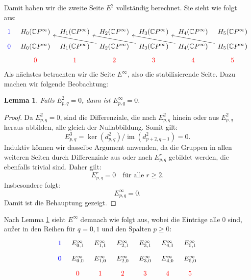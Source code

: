 \documentclass[12pt]{article}
\numberwithin{conj}{section}
\newtheorem{lemma}[conj]{Lemma}
\begin{document}
    Damit haben wir die zweite Seite $E^{2}$ vollständig berechnet. Sie sieht wie folgt
    aus:
    \[
        \begin{tikzcd}
            [sep=tiny] {\color{blue}1} & {H_0(\mathbb{C}P^\infty)} & {H_1(\mathbb{C}P^\infty)}
            & {H_2(\mathbb{C}P^\infty)} & {H_3(\mathbb{C}P^\infty)} & {H_4(\mathbb{C}P^\infty)}
            & {H_5(\mathbb{C}P^\infty)} \\ {\color{blue}0} & {H_0(\mathbb{C}P^\infty)}
            & {H_1(\mathbb{C}P^\infty)} & {H_2(\mathbb{C}P^\infty)} & {H_3(\mathbb{C}P^\infty)}
            & {H_4(\mathbb{C}P^\infty)} & {H_5(\mathbb{C}P^\infty)} \\ & {\color{red}0}
            & {\color{red}1} & {\color{red}2} & {\color{red}3} & {\color{red}4} & {\color{red}5}
            \arrow[from=2-4, to=1-2] \arrow[from=2-5, to=1-3] \arrow[from=2-6, to=1-4]
            \arrow[from=2-7, to=1-5]
        \end{tikzcd}
    \]
    Als nächstes betrachten wir die Seite $E^{\infty}$, also die stabilisierende Seite.
    Dazu machen wir folgende Beobachtung:

    \begin{lemma}
        \label{lemma:infinitysection} Falls $E^{2}_{p,q}= 0$, dann ist
        $E^{\infty}_{p,q}= 0$.
    \end{lemma}

    \begin{proof}
        Da $E^{2}_{p,q}= 0$, sind die Differenziale, die nach $E^{2}_{p,q}$ hinein oder
        aus $E^{2}_{p,q}$ heraus abbilden, alle gleich der Nullabbildung. Somit gilt:
        \[
            E^{3}_{p,q}= \ker(d^{2}_{p,q}) / \operatorname{im}(d^{2}_{p+2,q-1}) = 0.
        \]
        Induktiv können wir dasselbe Argument anwenden, da die Gruppen in allen weiteren
        Seiten durch Differenziale aus oder nach $E^{r}_{p,q}$ gebildet werden, die
        ebenfalls trivial sind. Daher gilt:
        \[
            E^{r}_{p,q}= 0 \quad \text{für alle }r \geq 2.
        \]
        Insbesondere folgt:
        \[
            E^{\infty}_{p,q}= 0.
        \]
        Damit ist die Behauptung gezeigt.
    \end{proof}

    Nach Lemma \ref{lemma:infinitysection} sieht $E^{\infty}$ demnach wie folgt
    aus, wobei die Einträge alle $0$ sind, außer in den Reihen für $q = 0,1$ und
    den Spalten $p \geq 0$:
    \[
        \begin{tikzcd}
            [sep=tiny] {\color{blue}1} & {E^\infty_{0,1}} & {E^\infty_{1,1}} & {E^\infty_{2,1}}
            & {E^\infty_{3,1}} & {E^\infty_{4,1}} & {E^\infty_{5,1}} \\ {\color{blue}0}
            & {E^\infty_{0,0}} & {E^\infty_{1,0}} & {E^\infty_{2,0}} & {E^\infty_{3,0}}
            & {E^\infty_{4,0}} & {E^\infty_{5,0}} \\ & {\color{red}0} & {\color{red}1}
            & {\color{red}2} & {\color{red}3} & {\color{red}4} & {\color{red}5}
        \end{tikzcd}
    \]
\end{document}
